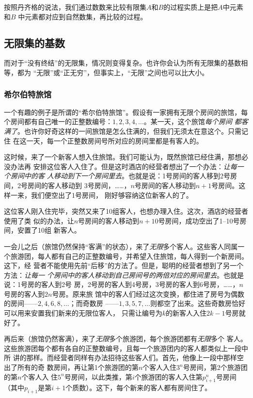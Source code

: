 按照丹齐格的说法，我们通过数数来比较有限集$A$和$B$的过程实质上是把$A$中元素和$B$
中元素都对应到自然数集，再比较的过程。

\subsection{无限集的基数}

而对于“没有终结”的无限集，情况则变得复杂。也许你会认为所有无限集的基数相等，都为
“无限”或“正无穷”，但事实上，“无限”之间也可以比大小。

\subsubsection{希尔伯特旅馆}

一个有趣的例子是所谓的“希尔伯特旅馆”。假设有一家拥有无限个房间的旅馆，每
个房间都有自己唯一的正整数编号：$1,2,3,4,\ldots $。某一天，这个旅馆\emph{每个房间
都客满了}。也许你好奇这样的一间旅馆是怎么住满的，但我们无须太在意这个。只需记住
在这一天，每一个正整数房间号所对应的房间里都是有客人的。

这时候，来了一个新客人想入住旅馆。我们可能认为，既然旅馆已经住满，那想必没办法再
安排这位客人入住了。但是这时酒店的经营者想出了一个办法：\emph{让每一个房间中的客
人移动到下一个房间里去}。也就是说：1号房间的客人移到2号房间，2号房间的客人移动到
3号房间，……，$n$号房间的客人移动到$n+1$号房间。这样一来，我们便空出了1号房间，
刚好够容纳这位新客人的了。

这位客人刚入住完毕，突然又来了10组客人，也想办理入住。这次，酒店的经营者使用了类
似的办法，让$n$号房间的客人移动到$n+10$号房间，成功空出了1--10号房间，安置了10组
新客人。

一会儿之后（旅馆仍然保持“客满”的状态），来了\emph{无限}多个客人。这些客人同属一
个旅游团，每人都有自己的正整数编号，并希望入住旅馆，每人得到一个新房间。这下，经
营者不能使用先前“后移”的方法了。但是，聪明的经营者想到了另一个方法：\emph{让每一
个房间中的客人移动到自己房间号的两倍对应的房间里去}。也就是说：1号房的客人到2号
房，2号房的客人到4号房，3号房的客人到6号房，……，$n$号房的客人到$2n$号房。原来旅
馆中的客人们经过这次变换，都住进了房号为偶数的房间——$2,4,6,8,\ldots $；而奇数房
——$1,3,5,7,\ldots $则都空了出来。这些奇数房恰好可以用来安置我们新来的无限位客人，
只需让编号为$k$的新客人入住$2k-1$号房就好了。

再后来（旅馆仍然客满），来了\emph{无限}多个旅游团，每个旅游团都有\emph{无限}多个
客人。这些旅游团每个都有各自的正整数编号，且每一个旅游团内的客人都类似上一段中所
讲的那样。而经营者同样有办法招待这些客人们。首先，他像上一段中那样空出了所有的奇
数房间，再让第1个旅游团的第$n$个客人入住$3^n$号房间，第2个旅游团的第$n$个客人入
住$5^n$号房间，以此类推，第$i$个旅游团的客人入住第$p_{i+1}^n$号房间（其中$p_{i+1}
$是第$i+1$个质数）。这下，每个新来的客人都有房间住了。

